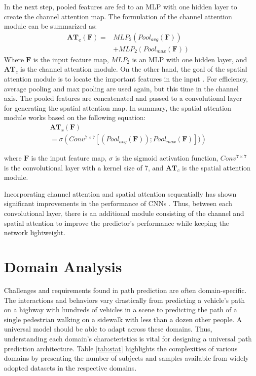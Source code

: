 \documentclass[sigconf]{acmart}
\begin{document}
In the next step, pooled features are fed to an MLP with one hidden layer to create the channel attention map. The formulation of the channel attention module can be summarized as:
\begin{equation}
\begin{aligned}
\mathbf{AT_{c}}(\mathbf{F}) = {} & MLP_{2} (Pool_{avg}(\mathbf{F})) \\
                                & +MLP_{2} (Pool_{max}(\mathbf{F}))
\end{aligned}
\end{equation}
Where $\mathbf{F}$ is the input feature map, $MLP_2$ is an MLP with one hidden layer, and $\mathbf{AT}_{c}$ is the channel attention module. 
On the other hand, the goal of the spatial attention module is to locate the important features in the input \cite{NIU202148}. For efficiency, average pooling and max pooling are used again, but this time in the channel axis. The pooled features are concatenated and passed to a convolutional layer for generating the spatial attention map. In summary, the spatial attention module works based on the following equation:
\begin{equation}
\begin{aligned}
&\mathbf{AT_s}(\mathbf{F}) \\
&=\sigma\left(Conv^{7 \times 7}[(Pool_{avg}(\mathbf{F})) ; Pool_{max}(\mathbf{F})])\right) 
&
\end{aligned}
\end{equation}

where $\mathbf{F}$ is the input feature map, $\sigma$ is the sigmoid activation function, $Conv^{7 \times 7}$ is the convolutional layer with a kernel size of 7, and $\mathbf{AT}_{c}$ is the spatial attention module. 

Incorporating channel attention and spatial attention sequentially has shown significant improvements in the performance of CNNs \cite{woo2018cbam}. Thus, between each convolutional layer, there is an additional module consisting of the channel and spatial attention to improve the predictor's performance while keeping the network lightweight.  





 \section{Domain Analysis}
Challenges and requirements found in path prediction are often domain-specific. The interactions and behaviors vary drastically from predicting a vehicle's path on a highway with hundreds of vehicles in a scene to predicting the path of a single pedestrian walking on a sidewalk with less than a dozen other people. A universal model should be able to adapt across these domains. Thus, understanding each domain's characteristics is vital for designing a universal path prediction architecture. Table \ref{tab:stat} highlights the complexities of various domains by presenting the number of subjects and samples available from widely adopted datasets in the respective domains.
\end{document}
